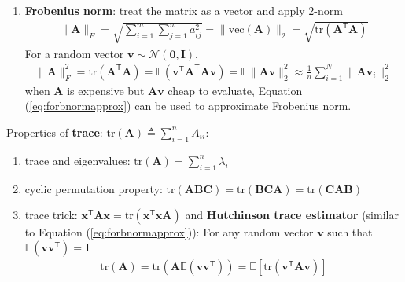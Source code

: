 \begin{enumerate}[{(1)}]
    \item \textbf{Frobenius norm}: treat the matrix as a vector and apply 2-norm
    \begin{gather}
        \|\mathbf{A}\|_F
        = \sqrt{\sum_{i=1}^m\sum_{j=1}^n{a_{ij}^2}}
        = \|\mathrm{vec}(\mathbf{A})\|_2
        = \sqrt{\mathrm{tr}(\mathbf{A}^\mathsf{T}\mathbf{A})}
    \end{gather}
    For a random vector $\bm{v}\sim\mathcal{N}(\mathbf{0},\mathbf{I})$,
    \begin{gather}
        \|\mathbf{A}\|_F^2
        = \mathrm{tr}(\mathbf{A}^\mathsf{T}\mathbf{A})
        = \mathbb{E}(\bm{v}^\mathsf{T}\mathbf{A}^\mathsf{T}\mathbf{A}\bm{v})
        = \mathbb{E}\|\mathbf{A}\bm{v}\|_2^2
        \approx \frac{1}{n}\sum_{i=1}^N\|\mathbf{Av}_i\|_2^2 \label{eq:forbnormapprox}
    \end{gather}
    when $\mathbf{A}$ is expensive but $\mathbf{A}\bm{v}$ cheap to evaluate, 
    Equation (\ref{eq:forbnormapprox}) can be used to approximate Frobenius norm.
\end{enumerate}

Properties of \textbf{trace}: $\mathrm{tr}(\mathbf{A})\triangleq\sum_{i=1}^n A_{ii}$:
\begin{enumerate}[{(1)}]
    \item trace and eigenvalues: $\mathrm{tr}(\mathbf{A})=\sum_{i=1}^n\lambda_i$
    
    \item cyclic permutation property: $\mathrm{tr}(\mathbf{ABC})=\mathrm{tr}(\mathbf{BCA})=\mathrm{tr}(\mathbf{CAB})$
    
    \item trace trick: $\bm{x}^\mathsf{T}\mathbf{A}\bm{x}=\mathrm{tr}(\bm{x}^\mathsf{T}\bm{x}\mathbf{A})$
    and \textbf{Hutchinson trace estimator} (similar to Equation (\ref{eq:forbnormapprox})):
    For any random vector $\bm{v}$ such that $\mathbb{E}(\bm{vv}^\mathsf{T})=\mathbf{I}$
    \begin{gather}
        \mathrm{tr}(\mathbf{A})
        = \mathrm{tr}(\mathbf{A}\mathbb{E}(\bm{vv}^\mathsf{T}))
        = \mathbb{E}[\mathrm{tr}(\bm{v}^\mathsf{T}\mathbf{A}\bm{v})]
    \end{gather}
\end{enumerate}

